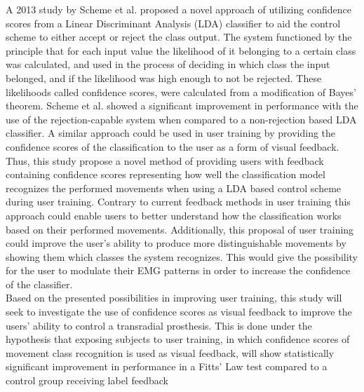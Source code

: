 A 2013 study by Scheme et al. \cite{Scheme2013} proposed a novel approach of utilizing confidence scores from a Linear Discriminant Analysis (LDA) classifier to aid the control scheme to either accept or reject the class output. The system functioned by the principle that for each input value the likelihood of it belonging to a certain class was calculated, and used in the process of deciding in which class the input belonged, and if the likelihood was high enough to not be rejected. These likelihoods called confidence scores, were calculated from a modification of Bayes' theorem. Scheme et al. \cite{Scheme2013} showed a significant improvement in performance with the use of the rejection-capable system when compared to a non-rejection based LDA classifier. A similar approach could be used in user training by providing the confidence scores of the classification to the user as a form of visual feedback. \\
Thus, this study propose a novel method of providing users with feedback containing confidence scores representing how well the classification model recognizes the performed movements when using a LDA based control scheme during user training. Contrary to current feedback methods in user training this approach could enable users to better understand how the classification works based on their performed movements. Additionally, this proposal of user training could improve the user's ability to produce more distinguishable movements by showing them which classes the system recognizes. This would give the possibility for the user to modulate their EMG patterns in order to increase the confidence of the classifier. \\
Based on the presented possibilities in improving user training, this study will seek to investigate the use of confidence scores as visual feedback to improve the users' ability to control a transradial prosthesis. %
This is done under the hypothesis that exposing subjects to user training, in which confidence scores of movement class recognition is used as visual feedback, will show statistically significant improvement in performance in a Fitts' Law test compared to a control group receiving label feedback

